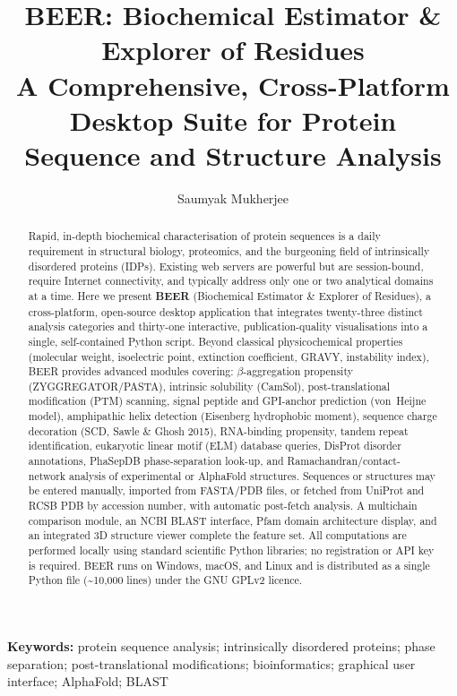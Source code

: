 \documentclass[12pt]{article}
\title{\textbf{BEER: Biochemical Estimator \& Explorer of Residues}\\[6pt]
\large A Comprehensive, Cross-Platform Desktop Suite for Protein\\
Sequence and Structure Analysis}
\author[1]{Saumyak Mukherjee}
\affil[1]{Department of Theoretical Biophysics,
          Max Planck Institute of Biophysics,\\
          Max-von-Laue-Str.~3, 60438 Frankfurt am Main, Germany}
\date{}
\begin{document}
\maketitle

\begin{abstract}
Rapid, in-depth biochemical characterisation of protein sequences is a daily
requirement in structural biology, proteomics, and the burgeoning field of
intrinsically disordered proteins (IDPs).
Existing web servers are powerful but are session-bound, require Internet
connectivity, and typically address only one or two analytical domains at
a time.
Here we present \textbf{BEER} (Biochemical Estimator \& Explorer of Residues),
a cross-platform, open-source desktop application that integrates twenty-three
distinct analysis categories and thirty-one interactive, publication-quality
visualisations into a single, self-contained Python script.
Beyond classical physicochemical properties (molecular weight, isoelectric
point, extinction coefficient, GRAVY, instability index), BEER provides
advanced modules covering: $\beta$-aggregation propensity (ZYGGREGATOR/PASTA),
intrinsic solubility (CamSol), post-translational modification (PTM)
scanning, signal peptide and GPI-anchor prediction (von~Heijne model),
amphipathic helix detection (Eisenberg hydrophobic moment), sequence charge
decoration (SCD, Sawle \& Ghosh 2015), RNA-binding propensity, tandem repeat
identification, eukaryotic linear motif (ELM) database queries, DisProt
disorder annotations, PhaSepDB phase-separation look-up, and
Ramachandran/contact-network analysis of experimental or AlphaFold structures.
Sequences or structures may be entered manually, imported from FASTA/PDB
files, or fetched from UniProt and RCSB PDB by accession number, with
automatic post-fetch analysis.
A multichain comparison module, an NCBI BLAST interface, Pfam domain
architecture display, and an integrated 3D structure viewer complete the
feature set.
All computations are performed locally using standard scientific Python
libraries; no registration or API key is required.
BEER runs on Windows, macOS, and Linux and is distributed as a single
Python file (\textasciitilde{}10,000 lines) under the GNU GPLv2 licence.
\end{abstract}

\noindent\textbf{Keywords:} protein sequence analysis; intrinsically disordered
proteins; phase separation; post-translational modifications; bioinformatics;
graphical user interface; AlphaFold; BLAST

\end{document}
